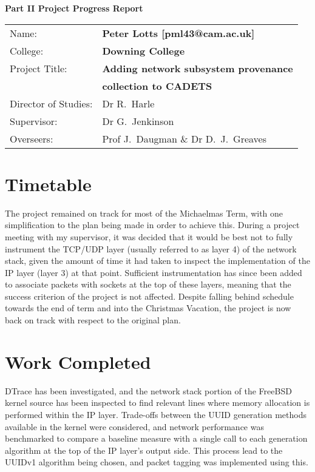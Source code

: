 \documentclass[a4paper,12pt,twoside,openright]{report}
\begin{document}
	{\LARGE \textbf{Part II Project Progress Report}}
	
	\vspace*{10mm}
	
	{\large
		\begin{tabular}{ll}
			Name:               & \bf Peter Lotts [pml43@cam.ac.uk]  	\\
			College:            & \bf Downing College               	\\
			Project Title:      & \bf Adding network subsystem provenance \\
								& \bf collection to CADETS 				\\
			Director of Studies:& Dr R.~Harle                   	 	\\
			Supervisor:         & Dr G.~Jenkinson                    	\\ 
			Overseers:         	& Prof J.~Daugman \& Dr D.~J.~Greaves  	\\
		\end{tabular}
	}

	\vspace*{10mm}
	\setcounter{secnumdepth}{0}

	\section{Timetable}
	
	The project remained on track for most of the Michaelmas Term, with one simplification to the plan being made in order to achieve this. During a project meeting with my supervisor, it was decided that it would be best not to fully instrument the TCP/UDP layer (usually referred to as layer 4) of the network stack, given the amount of time it had taken to inspect the implementation of the IP layer (layer 3) at that point. Sufficient instrumentation has since been added to associate packets with sockets at the top of these layers, meaning that the success criterion of the project is not affected. Despite falling behind schedule towards the end of term and into the Christmas Vacation, the project is now back on track with respect to the original plan.
	
	\section{Work Completed}
	
	DTrace has been investigated, and the network stack portion of the FreeBSD kernel source has been inspected to find relevant lines where memory allocation is performed within the IP layer. Trade-offs between the UUID generation methods available in the kernel were considered, and network performance was benchmarked to compare a baseline measure with a single call to each generation algorithm at the top of the IP layer's output side. This process lead to the UUIDv1 algorithm being chosen, and packet tagging was implemented using this.
	
\end{document}
